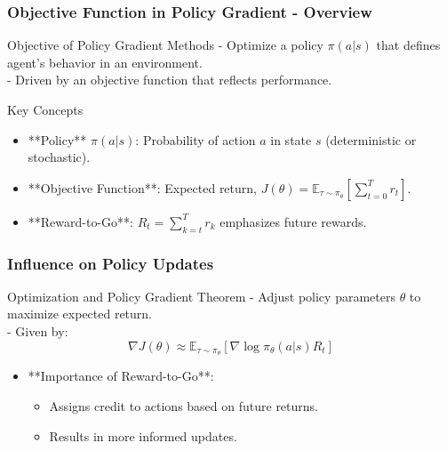 \documentclass[aspectratio=169]{beamer}
\begin{document}
\begin{frame}[fragile]
    \frametitle{Objective Function in Policy Gradient - Overview}
    \begin{block}{Objective of Policy Gradient Methods}
        - Optimize a policy \(\pi(a|s)\) that defines agent's behavior in an environment.\\
        - Driven by an objective function that reflects performance.
    \end{block}
    
    \begin{block}{Key Concepts}
        \begin{itemize}
            \item **Policy** \(\pi(a|s)\): Probability of action \(a\) in state \(s\) (deterministic or stochastic).
            \item **Objective Function**: Expected return, \(J(\theta) = \mathbb{E}_{\tau \sim \pi_\theta}\left[\sum_{t=0}^{T} r_t\right]\).
            \item **Reward-to-Go**: \(R_t = \sum_{k=t}^{T} r_k\) emphasizes future rewards.
        \end{itemize}
    \end{block}
\end{frame}

\begin{frame}[fragile]
    \frametitle{Influence on Policy Updates}
    \begin{block}{Optimization and Policy Gradient Theorem}
        - Adjust policy parameters \(\theta\) to maximize expected return.\\
        - Given by:
        \[
        \nabla J(\theta) \approx \mathbb{E}_{\tau \sim \pi_\theta}\left[\nabla \log \pi_\theta(a|s) R_t\right]
        \]

        \begin{itemize}
            \item **Importance of Reward-to-Go**:
            \begin{itemize}
                \item Assigns credit to actions based on future returns.
                \item Results in more informed updates.
            \end{itemize}
        \end{itemize}
    \end{block}
\end{frame}
\end{document}
